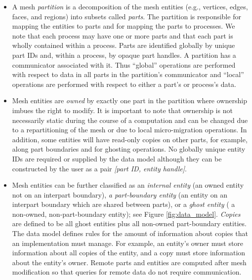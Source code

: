 \documentclass[letterpaper]{jpconf}
\begin{document}
\begin{itemize}

%
\item A mesh {\it partition} is a decomposition of the mesh entities 
(e.g., vertices, edges, faces, and regions) into subsets called {\it
parts}.  The partition is responsible for mapping the entities to
parts and for mapping the parts to processes.  We note that each
process may have one or more parts and that each part is wholly
contained within a process.  Parts are identified globally by unique
part IDs and, within a process, by opaque part handles.  A partition
has a communicator associated with it.  Thus ``global'' operations are
performed with respect to data in all parts in the partition's
communicator and ``local'' operations are performed with respect to
either a part's or process's data.

\item Mesh entities are {\it owned} by exactly one part in the
partition where ownership imbues the right to modify. It is important
to note that ownership is not necessarily static during the course of
a computation and can be changed due to a repartitioning of the mesh
or due to local micro-migration operations.  In addition, some
entities will have read-only copies on other parts, for example, along
part boundaries and for ghosting operations. No globally unique
entity IDs are required or supplied by the data model although they can be
constructed by the user as a pair {\it [part ID, entity handle]}.

\item Mesh entities can be further classified as an {\it internal entity} (an owned
entity not on an interpart boundary), {\it a part-boundary entity} (an
entity on an interpart boundary which are shared between parts), or a
{\it ghost entity} ( a non-owned, non-part-boundary entity); see
Figure \ref{fig:data_model}. {\it Copies} are defined to be all ghost
entities plus all non-owned part-boundary entities.  The data model
defines rules for the amount of information about copies that an
implementation must manage.  For example, an entity's owner must store
information about all copies of the entity, and a copy must store
information about the entity's owner.  Remote parts and entities are
computed after mesh modification so
that queries for remote data do not require communication.

\end{itemize}
\end{document}
